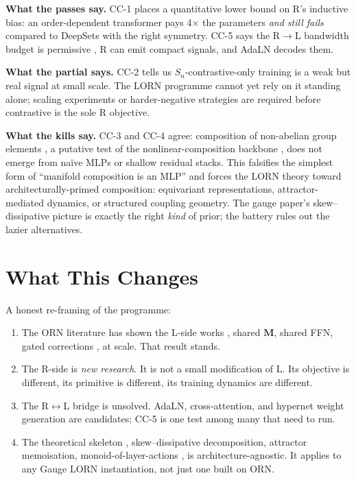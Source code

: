 \documentclass[10pt, twocolumn, a4paper]{article}
\newcommand{\Sn}{S_n}
\newcommand{\M}{\mathbf{M}}
\begin{document}
\textbf{What the passes say.}
CC-1 places a quantitative lower bound on R's inductive bias: an order-dependent transformer pays 4$\times$ the parameters \emph{and still fails} compared to DeepSets with the right symmetry. CC-5 says the R$\to$L bandwidth budget is permissive ,  R can emit compact signals, and AdaLN decodes them.

\textbf{What the partial says.}
CC-2 tells us $\Sn$-contrastive-only training is a weak but real signal at small scale. The LORN programme cannot yet rely on it standing alone; scaling experiments or harder-negative strategies are required before contrastive is the sole R objective.

\textbf{What the kills say.}
CC-3 and CC-4 agree: composition of non-abelian group elements ,  a putative test of the nonlinear-composition backbone ,  does not emerge from na\"{i}ve MLPs or shallow residual stacks. This falsifies the simplest form of ``manifold composition is an MLP'' and forces the LORN theory toward architecturally-primed composition: equivariant representations, attractor-mediated dynamics, or structured coupling geometry. The gauge paper's skew--dissipative picture is exactly the right \emph{kind} of prior; the battery rules out the lazier alternatives.

\section{What This Changes}

A honest re-framing of the programme:

\begin{enumerate}[nosep]
\item The ORN literature has shown the L-side works ,  shared $\M$, shared FFN, gated corrections ,  at scale. That result stands.
\item The R-side is \emph{new research}. It is not a small modification of L. Its objective is different, its primitive is different, its training dynamics are different.
\item The R$\leftrightarrow$L bridge is unsolved. AdaLN, cross-attention, and hypernet weight generation are candidates; CC-5 is one test among many that need to run.
\item The theoretical skeleton ,  skew--dissipative decomposition, attractor memoisation, monoid-of-layer-actions ,  is architecture-agnostic. It applies to any Gauge LORN instantiation, not just one built on ORN.
\end{enumerate}
\end{document}

